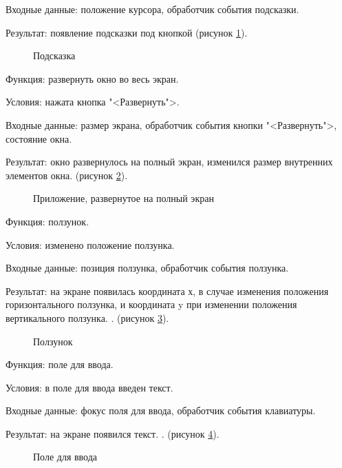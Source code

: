 Входные данные: положение курсора, обработчик события подсказки.

Результат: появление подсказки под кнопкой (рисунок \ref{tip:image}).

\begin{figure}[H] %
	\caption{Подсказка}
	\label{tip:image}
\end{figure}

Функция: развернуть окно во весь экран.

Условия: нажата кнопка "<Развернуть">.

Входные данные: размер экрана, обработчик события кнопки "<Развернуть">, состояние окна.

Результат: окно развернулось на полный экран, изменился размер внутренних элементов окна. (рисунок \ref{fullscreen:image}).

\begin{figure}[H] %
	\caption{Приложение, развернутое на полный экран}
	\label{fullscreen:image}
\end{figure}

Функция: ползунок.

Условия: изменено положение ползунка.

Входные данные: позиция ползунка, обработчик события ползунка.

Результат: на экране появилась координата х, в случае изменения положения горизонтального ползунка, и координата y при изменении положения вертикального ползунка.
. (рисунок \ref{scroll:image}).

\begin{figure}[H] %
	\caption{Ползунок}
	\label{scroll:image}
\end{figure}

Функция: поле для ввода.

Условия: в поле для ввода введен текст.

Входные данные: фокус поля для ввода, обработчик события клавиатуры.

Результат: на экране появился текст.
. (рисунок \ref{input:image}).

\begin{figure}[H] %
	\caption{Поле для ввода}
	\label{input:image}
\end{figure}

